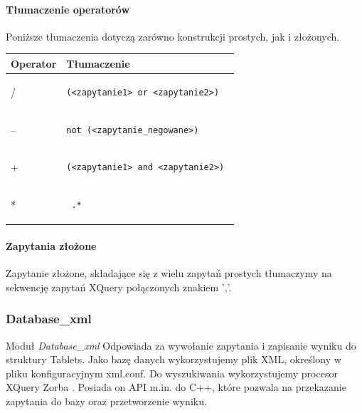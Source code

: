 \paragraph{Tłumaczenie operatorów}
Poniższe tłumaczenia dotyczą zarówno konstrukcji prostych, jak i złożonych.

\begin{longtable}{|p{1in}|p{3in}|}
\hline
{\bf Operator} & {\bf Tłumaczenie}\\
\hline
\endhead
/ & \begin{verbatim}(<zapytanie1> or <zapytanie2>) \end{verbatim} \\
\hline
-- & \begin{verbatim}not (<zapytanie_negowane>) \end{verbatim}\\  
\hline
+ & \begin{verbatim}(<zapytanie1> and <zapytanie2>) \end{verbatim}\\ 
\hline
* & \begin{verbatim} .*\end{verbatim}  \\ 
\hline
\end{longtable}

\paragraph{Zapytania złożone}
Zapytanie złożone, składające się z wielu zapytań prostych tłumaczymy na sekwencję zapytań XQuery połączonych znakiem ','.

\subsubsection{Database\_xml}
Moduł \textit{Database\_xml} Odpowiada za wywołanie zapytania i zapisanie wyniku do struktury Tablets.
Jako bazę danych wykorzystujemy plik XML, określony w pliku konfiguracyjnym xml.conf. 
Do wyszukiwania wykorzystujemy procesor XQuery Zorba \cite{zorba}. 
Posiada on API m.in. do C++, które pozwala na przekazanie zapytania do bazy oraz przetworzenie wyniku.
